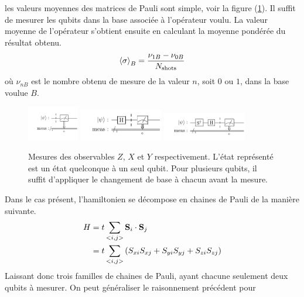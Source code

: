 \documentclass[../main.tex]{subfiles}
\begin{document}
        les valeurs moyennes des matrices de Pauli sont simple, voir la figure (\ref{fig:mes}).
        Il suffit de mesurer les qubits dans la base associée à l'opérateur voulu.
        La valeur moyenne de l'opérateur s'obtient ensuite en calculant la moyenne
        pondérée du résultat obtenu.
        \begin{align}
            \expval{\sigma}_B&=\frac{\nu_{1B}-\nu_{0B}}{N_{\text{shots}}}\\
        \end{align}
        où $\nu_{nB}$ est le nombre obtenu de mesure de la valeur $n$, soit $0$ ou $1
        $, dans la base voulue $B$.
        \begin{figure}[H]
            \begin{center}
                \includegraphics[width=0.2\textwidth]{figs/measure_z.pdf}
                \includegraphics[width=0.325\textwidth]{figs/measure_x.pdf}
                \includegraphics[width=0.325\textwidth]{figs/measure_y.pdf}
            \end{center}
            \caption{Mesures des observables $Z$, $X$ et $Y$ respectivement. L'état
            représenté est un état quelconque à un seul qubit. Pour plusieurs qubits,
            il suffit d'appliquer le changement de base à chacun avant la mesure.}
            \label{fig:mes}
        \end{figure}
        Dans le cas présent, l'hamiltonien se décompose en chaines de Pauli de la
        manière suivante.
        \begin{align}
            H&=t\sum_{<i,j>}\mathbf{S}_i\cdot\mathbf{S}_j\\
            &=t\sum_{<i,j>}\qty(S_{xi}S_{xj}+S_{yi}S_{yj}+S_{zi}S_{zj})
        \end{align}
        Laissant donc trois familles de chaines de Pauli, ayant chacune seulement
        deux qubits à mesurer. On peut généraliser le raisonnement précédent pour
\end{document}
